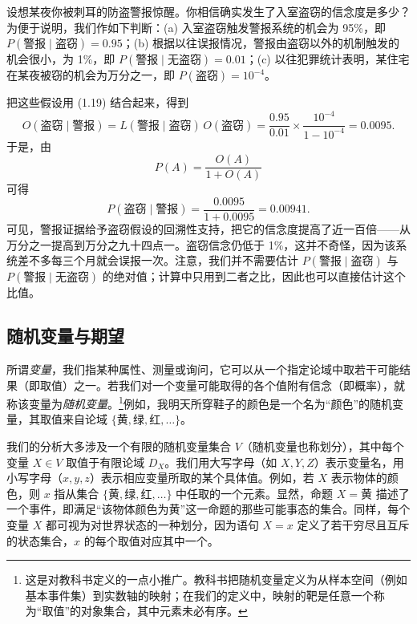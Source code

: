 \begin{example}[入室盗窃与警报]
设想某夜你被刺耳的防盗警报惊醒。你相信确实发生了入室盗窃的信念度是多少？为便于说明，我们作如下判断：(a) 入室盗窃触发警报系统的机会为 95\%，即 $P(\text{警报}\mid\text{盗窃})=0.95$；(b) 根据以往误报情况，警报由盗窃以外的机制触发的机会很小，为 1\%，即 $P(\text{警报}\mid\text{无盗窃})=0.01$；(c) 以往犯罪统计表明，某住宅在某夜被窃的机会为万分之一，即 $P(\text{盗窃})=10^{-4}$。

把这些假设用 \textup{(1.19)} 结合起来，得到
\[
O(\text{盗窃}\mid\text{警报}) = L(\text{警报}\mid\text{盗窃})\,O(\text{盗窃}) = \frac{0.95}{0.01}\times\frac{10^{-4}}{1-10^{-4}} = 0.0095 .
\]
于是，由
\begin{equation}
P(A) = \frac{O(A)}{1+O(A)} \tag{1.20}
\end{equation}
可得
\[
P(\text{盗窃}\mid\text{警报}) = \frac{0.0095}{1+0.0095} = 0.00941 .
\]
可见，警报证据给予盗窃假设的回溯性支持，把它的信念度提高了近一百倍——从万分之一提高到万分之九十四点一。盗窃信念仍低于 1\%，这并不奇怪，因为该系统差不多每三个月就会误报一次。注意，我们并不需要估计 $P(\text{警报}\mid\text{盗窃})$ 与 $P(\text{警报}\mid\text{无盗窃})$ 的绝对值；计算中只用到二者之比，因此也可以直接估计这个比值。
\end{example}

\subsection{随机变量与期望}

所谓\emph{变量}，我们指某种属性、测量或询问，它可以从一个指定论域中取若干可能结果（即取值）之一。若我们对一个变量可能取得的各个值附有信念（即概率），就称该变量为\emph{随机变量}。\footnote{这是对教科书定义的一点小推广。教科书把随机变量定义为从样本空间（例如基本事件集）到实数轴的映射；在我们的定义中，映射的靶是任意一个称为“取值”的对象集合，其中元素未必有序。}例如，我明天所穿鞋子的颜色是一个名为“颜色”的随机变量，其取值来自论域 $\{\text{黄},\text{绿},\text{红},\dots\}$。

我们的分析大多涉及一个有限的随机变量集合 $V$（随机变量也称划分），其中每个变量 $X\in V$ 取值于有限论域 $D_X$。我们用大写字母（如 $X,Y,Z$）表示变量名，用小写字母（$x,y,z$）表示相应变量所取的某个具体值。例如，若 $X$ 表示物体的颜色，则 $x$ 指从集合 $\{\text{黄},\text{绿},\text{红},\dots\}$ 中任取的一个元素。显然，命题 $X=\text{黄}$ 描述了一个事件，即满足“该物体颜色为黄”这一命题的那些可能事态的集合。同样，每个变量 $X$ 都可视为对世界状态的一种划分，因为语句 $X=x$ 定义了若干穷尽且互斥的状态集合，$x$ 的每个取值对应其中一个。


